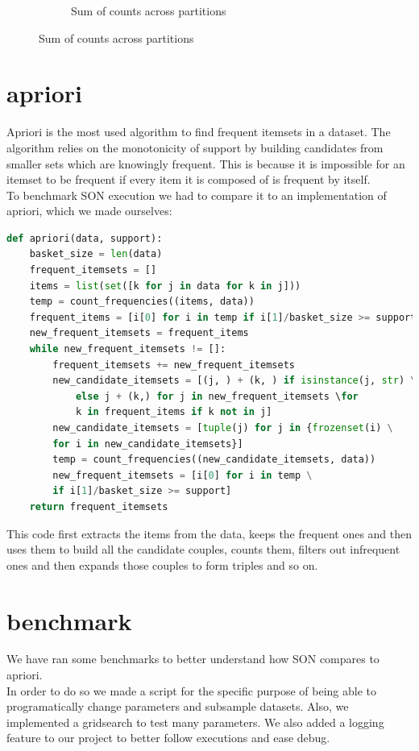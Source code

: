\documentclass[a4paper]{article}
\begin{document}
\begin{figure}[h]
\begin{subfigure}[b]{0.3\textwidth}
         	\caption{Sum of counts across partitions}
         	\label{fig:totals}
		\end{subfigure}
	\end{figure}
	
	\newpage
	
	\section{apriori}
	\label{section:apriori}
	
	Apriori is the most used algorithm to find frequent itemsets in a dataset. The algorithm relies on the monotonicity of support by building candidates from smaller sets which are knowingly frequent. This is because it is impossible for an itemset to be frequent if every item it is composed of is frequent by itself.\\
	
	To benchmark SON execution we had to compare it to an implementation of apriori, which we made ourselves:
	\begin{lstlisting}[language=Python]
def apriori(data, support):
    basket_size = len(data)
    frequent_itemsets = []
    items = list(set([k for j in data for k in j]))
    temp = count_frequencies((items, data))
    frequent_items = [i[0] for i in temp if i[1]/basket_size >= support]
    new_frequent_itemsets = frequent_items
    while new_frequent_itemsets != []:
        frequent_itemsets += new_frequent_itemsets
        new_candidate_itemsets = [(j, ) + (k, ) if isinstance(j, str) \
        	else j + (k,) for j in new_frequent_itemsets \for
        	k in frequent_items if k not in j]
        new_candidate_itemsets = [tuple(j) for j in {frozenset(i) \
        for i in new_candidate_itemsets}]
        temp = count_frequencies((new_candidate_itemsets, data))
        new_frequent_itemsets = [i[0] for i in temp \
        if i[1]/basket_size >= support]
    return frequent_itemsets	
    \end{lstlisting}
    This code first extracts the items from the data, keeps the frequent ones and then uses them to build all the candidate couples, counts them, filters out infrequent ones and then expands those couples to form triples and so on.
	
	\section{benchmark}
	We have ran some benchmarks to better understand how SON compares to apriori.\\
	In order to do so we made a script for the specific purpose of being able to programatically change parameters and 
	subsample datasets.
	Also, we implemented a gridsearch to test many parameters. We also added a logging feature to our project to better follow executions and ease debug.
	
\end{document}
